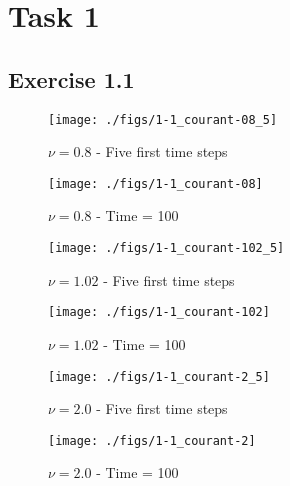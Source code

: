 \section{Task 1}
\subsection{Exercise 1.1}
\label{app:11}
\begin{figure}[H]
    \centering
    \texttt{[image: ./figs/1-1\_courant-08\_5]}
    \caption{$\nu = 0.8$ - Five first time steps}%
\end{figure}
\begin{figure}[H]
    \centering
    \texttt{[image: ./figs/1-1\_courant-08]}
    \caption{$\nu = 0.8$ - Time = 100}%
\end{figure}
\begin{figure}[H]
    \centering
    \texttt{[image: ./figs/1-1\_courant-102\_5]}
    \caption{$\nu = 1.02$ - Five first time steps}%
\end{figure}
\begin{figure}[H]
    \centering
    \texttt{[image: ./figs/1-1\_courant-102]}
    \caption{$\nu = 1.02$ - Time = 100}%
\end{figure}
\begin{figure}[H]
    \centering
    \texttt{[image: ./figs/1-1\_courant-2\_5]}
    \caption{$\nu = 2.0$ - Five first time steps}%
\end{figure}
\begin{figure}[H]
    \centering
    \texttt{[image: ./figs/1-1\_courant-2]}
    \caption{$\nu = 2.0$ - Time = 100}%
\end{figure}

